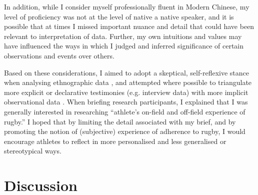 \begin{CJK}{UTF8}{gbsn}
 In addition, while I consider myself professionally fluent in Modern Chinese, my level of proficiency was not at the level of native a native speaker, and it is possible that at times I missed important nuance and detail that could have been relevant to interpretation of data. Further, my own intuitions and values may have influenced the ways in which I judged and inferred significance of certain observations and  events over others.

 Based on these considerations, I aimed to adopt a skeptical, self-reflexive stance when analysing ethnographic data \citep{Lichterman2017}, and attempted where possible to triangulate more explicit or declarative testimonies (e.g. interview data) with more implicit observational data \citep[see, for example:][]{Duffy1987}.
 When briefing research participants, I explained that I was generally interested in researching ``athlete's on-field and off-field experience of rugby.'' I hoped that by limiting the detail associated with my brief, and by promoting the notion of (subjective) experience of adherence to rugby, I would encourage athletes to reflect in more personalised and less generalised or stereotypical ways.









\section{Discussion}















                                                          \end{CJK}
